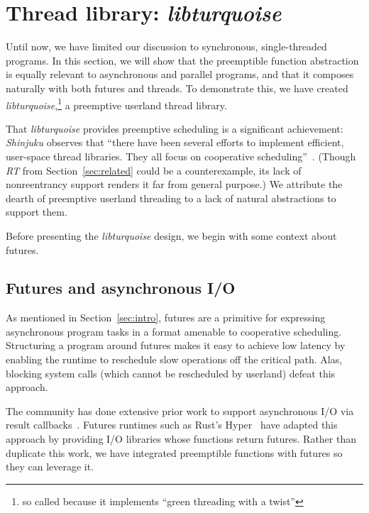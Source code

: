\section{Thread library: \textit{libturquoise}}
\label{sec:libturquoise}

Until now, we have limited our discussion to synchronous, single-threaded programs.
In this section, we will show that the preemptible function abstraction is equally
relevant to asynchronous and parallel programs, and that it composes naturally with
both futures and threads.  To demonstrate this, we have created
\textit{libturquoise},\footnote{so called because it implements ``green threading
with a twist''} a preemptive userland thread library.

That \textit{libturquoise} provides preemptive scheduling is a significant
achievement:\@
\textit{Shinjuku} observes that ``there have been several efforts to implement
efficient, user-space thread libraries.  They all focus on cooperative
scheduling''~\cite{Kaffes:nsdi2019}.  (Though \textit{RT} from
Section~\ref{sec:related} could be a counterexample, its lack of nonreentrancy
support renders it far from general purpose.)  We attribute the dearth of preemptive
userland threading to a lack of natural abstractions to support them.

Before presenting the \textit{libturquoise} design, we begin with some context about
futures.


\subsection{Futures and asynchronous I/O}

As mentioned in Section~\ref{sec:intro}, futures are a primitive for expressing
asynchronous program tasks in a format amenable to cooperative scheduling.
Structuring a program around futures makes it easy to achieve low latency by enabling
the runtime to reschedule slow operations off the critical path.  Alas, blocking
system calls (which cannot be rescheduled by userland) defeat this approach.

The community has done extensive prior work to support asynchronous I/O via result
callbacks~\cite{www-libevent, www-libev, www-libuv, www-mordor}.  Futures runtimes
such as Rust's Hyper~\cite{www-hyper} have adapted this approach by providing I/O
libraries whose functions return futures.  Rather than duplicate this work, we have
integrated preemptible functions with futures so they can leverage it.


